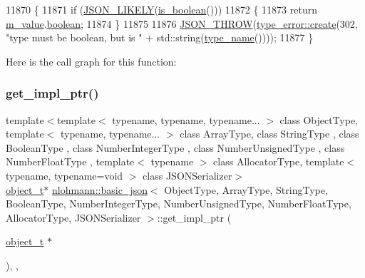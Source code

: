 \begin{DoxyCode}
11870     \{
11871         \textcolor{keywordflow}{if} (\hyperlink{json_8hpp_a41ecd1c4cf7c3d56477b9b685b5daa72}{JSON\_LIKELY}(\hyperlink{classnlohmann_1_1basic__json_a943e8cb182d0f2365c76d64b42eaa6fd}{is\_boolean}()))
11872         \{
11873             \textcolor{keywordflow}{return} \hyperlink{classnlohmann_1_1basic__json_aeb0814f76966f99290cb29e127c90a77}{m\_value}.\hyperlink{unionnlohmann_1_1basic__json_1_1json__value_afd0f8ec00c40301efffd01a276959371}{boolean};
11874         \}
11875 
11876         \hyperlink{json_8hpp_a6c274f6db2e65c1b66c7d41b06ad690f}{JSON\_THROW}(\hyperlink{classnlohmann_1_1detail_1_1type__error_aecc083aea4b698c33d042670ba50c10f}{type\_error::create}(302, \textcolor{stringliteral}{"type must be boolean, but is "} + 
      std::string(\hyperlink{classnlohmann_1_1basic__json_a9d0a478571f82f0163b96b2424cd998f}{type\_name}())));
11877     \}
\end{DoxyCode}
Here is the call graph for this function\+:
\mbox{\label{classnlohmann_1_1basic__json_a58b65f595883fb93333423ec5e3bafee}} 
\subsubsection{\texorpdfstring{get\+\_\+impl\+\_\+ptr()}{get\_impl\_ptr()}\hspace{0.1cm}{\footnotesize\ttfamily [1/14]}}
{\footnotesize\ttfamily template$<$template$<$ typename, typename, typename... $>$ class Object\+Type, template$<$ typename, typename... $>$ class Array\+Type, class String\+Type , class Boolean\+Type , class Number\+Integer\+Type , class Number\+Unsigned\+Type , class Number\+Float\+Type , template$<$ typename $>$ class Allocator\+Type, template$<$ typename, typename=void $>$ class J\+S\+O\+N\+Serializer$>$ \\
\hyperlink{classnlohmann_1_1basic__json_a5e48a7893520e1314bf0c9723e26ea2a}{object\+\_\+t}$\ast$ \hyperlink{classnlohmann_1_1basic__json}{nlohmann\+::basic\+\_\+json}$<$ Object\+Type, Array\+Type, String\+Type, Boolean\+Type, Number\+Integer\+Type, Number\+Unsigned\+Type, Number\+Float\+Type, Allocator\+Type, J\+S\+O\+N\+Serializer $>$\+::get\+\_\+impl\+\_\+ptr (\begin{DoxyParamCaption}\item[{\hyperlink{classnlohmann_1_1basic__json_a5e48a7893520e1314bf0c9723e26ea2a}{object\+\_\+t} $\ast$}]{ }\end{DoxyParamCaption})\hspace{0.3cm}{\ttfamily [inline]}, {\ttfamily [private]}, {\ttfamily [noexcept]}}




